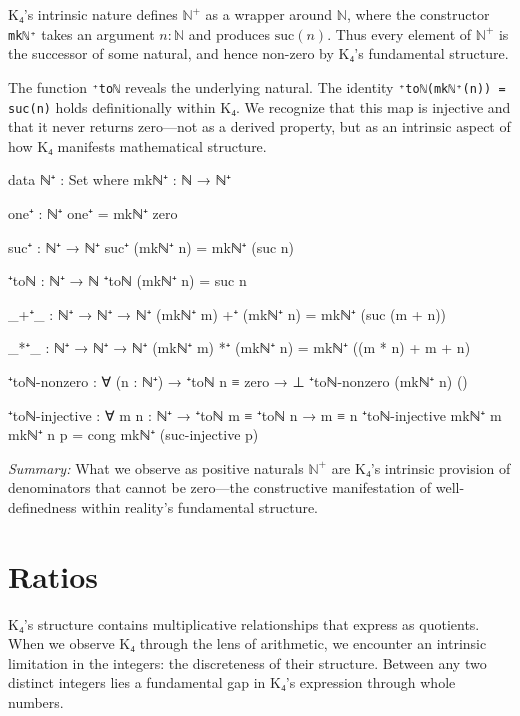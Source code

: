 \documentclass[11pt,a4paper]{book}
\begin{document}
K₄'s intrinsic nature defines $\mathbb{N}^+$ as a wrapper around $\mathbb{N}$, where the constructor \texttt{mkℕ⁺} 
takes an argument $n : \mathbb{N}$ and produces $\mathrm{suc}(n)$. Thus every element 
of $\mathbb{N}^+$ is the successor of some natural, and hence non-zero by K₄'s fundamental structure.

The function \texttt{⁺toℕ} reveals the underlying natural. The identity \texttt{⁺toℕ(mkℕ⁺(n)) = suc(n)} 
holds definitionally within K₄. We recognize that this map is injective and that it never returns zero—not as a derived property, but as an intrinsic aspect of how K₄ manifests mathematical structure.

\begin{code}
data ℕ⁺ : Set where
  mkℕ⁺ : ℕ → ℕ⁺

one⁺ : ℕ⁺
one⁺ = mkℕ⁺ zero

suc⁺ : ℕ⁺ → ℕ⁺
suc⁺ (mkℕ⁺ n) = mkℕ⁺ (suc n)

⁺toℕ : ℕ⁺ → ℕ
⁺toℕ (mkℕ⁺ n) = suc n

_+⁺_ : ℕ⁺ → ℕ⁺ → ℕ⁺
(mkℕ⁺ m) +⁺ (mkℕ⁺ n) = mkℕ⁺ (suc (m + n))

_*⁺_ : ℕ⁺ → ℕ⁺ → ℕ⁺
(mkℕ⁺ m) *⁺ (mkℕ⁺ n) = mkℕ⁺ ((m * n) + m + n)
\end{code}
\begin{code}
⁺toℕ-nonzero : ∀ (n : ℕ⁺) → ⁺toℕ n ≡ zero → ⊥
⁺toℕ-nonzero (mkℕ⁺ n) ()

⁺toℕ-injective : ∀ {m n : ℕ⁺} → ⁺toℕ m ≡ ⁺toℕ n → m ≡ n
⁺toℕ-injective {mkℕ⁺ m} {mkℕ⁺ n} p = cong mkℕ⁺ (suc-injective p)
\end{code}

\medskip
\noindent\textit{Summary:} What we observe as positive naturals $\mathbb{N}^+$ are K₄'s intrinsic provision of denominators that cannot be zero—the constructive manifestation of well-definedness within reality's fundamental structure.

\chapter{Ratios}

K₄'s structure contains multiplicative relationships that express as quotients. When we observe K₄ through the lens of arithmetic, we encounter an intrinsic limitation in the integers: the discreteness of their structure. Between any two distinct integers lies a fundamental gap in K₄'s expression through whole numbers.
\end{document}
